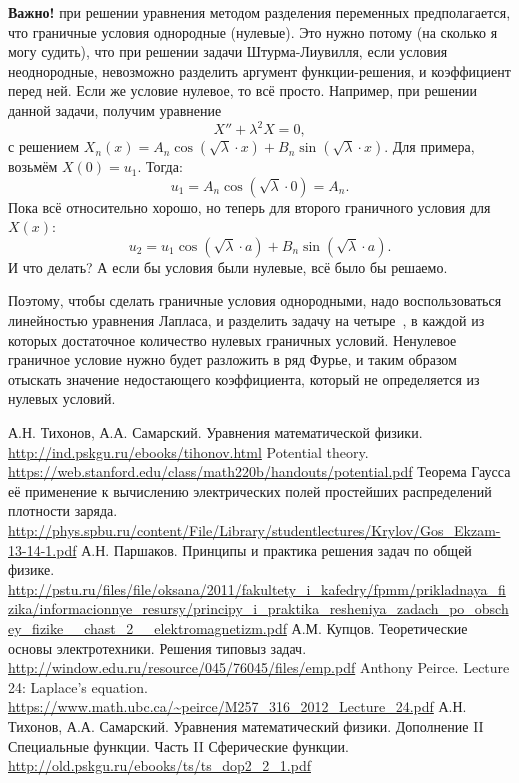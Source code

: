 \documentclass[12pt]{report}
\begin{document}
\textbf{Важно!} при решении уравнения методом разделения переменных предполагается, что граничные условия однородные (нулевые). Это нужно потому (на сколько я могу судить), что при решении задачи Штурма-Лиувилля, если условия неоднородные, невозможно разделить аргумент функции-решения, и коэффициент перед ней. Если же условие нулевое, то всё просто. Например, при решении данной задачи, получим уравнение
\[
X'' + \lambda^2 X = 0,
\]
с решением $X_n(x) = A_n \cos(\sqrt{\lambda}\cdot x) + B_n \sin(\sqrt{\lambda}\cdot x)$.
Для примера, возьмём $X(0) = u_1$. Тогда:
\[
u_1 = A_n\cos(\sqrt{\lambda}\cdot 0) = A_n.
\]
Пока всё относительно хорошо, но теперь для второго граничного условия для $X(x)$:
\[
	u_2 = u_1\cos(\sqrt{\lambda}\cdot a) + B_n\sin(\sqrt{\lambda}\cdot a).
\]
И что делать? А если бы условия были нулевые, всё было бы решаемо.

Поэтому, чтобы сделать граничные условия однородными, надо воспользоваться линейностью уравнения Лапласа, и разделить задачу на четыре~\cite{Laplace-eq-rectangle}, в каждой из которых достаточное количество нулевых граничных условий. Ненулевое граничное условие нужно будет разложить в ряд Фурье, и таким образом отыскать значение недостающего коэффициента, который не определяется из нулевых условий.


\begin{thebibliography}{0}
	А.Н. Тихонов, А.А. Самарский.
	Уравнения математической физики.
	\url{http://ind.pskgu.ru/ebooks/tihonov.html}
	Potential theory.
	\url{https://web.stanford.edu/class/math220b/handouts/potential.pdf}
	Теорема Гаусса  её применение к вычислению электрических полей простейших распределений плотности заряда.
	\url{http://phys.spbu.ru/content/File/Library/studentlectures/Krylov/Gos_Ekzam-13-14-1.pdf}
	А.Н. Паршаков. Принципы и практика решения задач по общей физике.
	\url{http://pstu.ru/files/file/oksana/2011/fakultety_i_kafedry/fpmm/prikladnaya_fizika/informacionnye_resursy/principy_i_praktika_resheniya_zadach_po_obschey_fizike__chast_2__elektromagnetizm.pdf}
	А.М. Купцов. Теоретические основы электротехники. Решения типовыз задач.
	\url{http://window.edu.ru/resource/045/76045/files/emp.pdf}
	Anthony Peirce. Lecture 24: Laplace's equation.
	\url{https://www.math.ubc.ca/~peirce/M257_316_2012_Lecture_24.pdf}
	А.Н. Тихонов, А.А. Самарский.
	Уравнения математический физики. 
	Дополнение  II Специальные функции. 
	Часть II Сферические функции.
	\url{http://old.pskgu.ru/ebooks/ts/ts_dop2_2_1.pdf}
\end{thebibliography}
\end{document}
